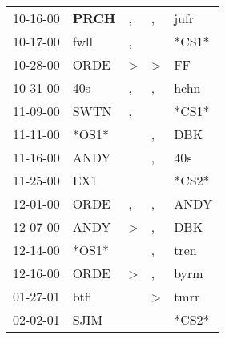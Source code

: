 \begin{supertabular}{p{0.07\textwidth}p{0.06\textwidth}p{0.02\textwidth}p{0.02\textwidth}p{0.06\textwidth}}
          10-16-00\textsuperscript{} &  \textbf{PRCH\textsuperscript{}} &                , &                , &           jufr\textsuperscript{} \\
          10-17-00\textsuperscript{} &           fwll\textsuperscript{} &                , &                  &                            *CS1* \\
          10-28-00\textsuperscript{} &           ORDE\textsuperscript{} &     \textgreater &     \textgreater &             FF\textsuperscript{} \\
          10-31-00\textsuperscript{} &            40s\textsuperscript{} &                , &                , &           hchn\textsuperscript{} \\
          11-09-00\textsuperscript{} &           SWTN\textsuperscript{} &                , &                  &                            *CS1* \\
          11-11-00\textsuperscript{} &                            *OS1* &                  &                , &            DBK\textsuperscript{} \\
          11-16-00\textsuperscript{} &           ANDY\textsuperscript{} &                  &                , &            40s\textsuperscript{} \\
          11-25-00\textsuperscript{} &            EX1\textsuperscript{} &                  &                  &                            *CS2* \\
          12-01-00\textsuperscript{} &           ORDE\textsuperscript{} &                , &                , &           ANDY\textsuperscript{} \\
          12-07-00\textsuperscript{} &           ANDY\textsuperscript{} &     \textgreater &                , &            DBK\textsuperscript{} \\
          12-14-00\textsuperscript{} &                            *OS1* &                  &                , &           tren\textsuperscript{} \\
          12-16-00\textsuperscript{} &           ORDE\textsuperscript{} &     \textgreater &                , &           byrm\textsuperscript{} \\
          01-27-01\textsuperscript{} &           btfl\textsuperscript{} &                  &     \textgreater &           tmrr\textsuperscript{} \\
          02-02-01\textsuperscript{} &           SJIM\textsuperscript{} &                  &                  &                            *CS2* \\

\end{supertabular}
